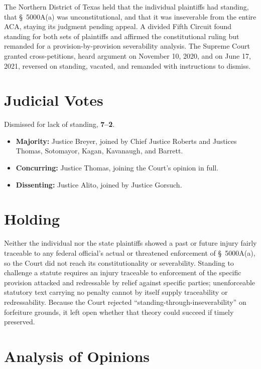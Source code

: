 \documentclass[12pt]{article}
\begin{document}
The Northern District of Texas held that the individual plaintiffs had standing, that \S\ 5000A(a) was unconstitutional, and that it was inseverable from the entire ACA, staying its judgment pending appeal. A divided Fifth Circuit found standing for both sets of plaintiffs and affirmed the constitutional ruling but remanded for a provision-by-provision severability analysis. The Supreme Court granted cross-petitions, heard argument on November 10, 2020, and on June 17, 2021, reversed on standing, vacated, and remanded with instructions to dismiss.

\section{Judicial Votes}

Dismissed for lack of standing, \textbf{7--2}.
\begin{itemize}
\item \textbf{Majority:} Justice Breyer, joined by Chief Justice Roberts and Justices Thomas, Sotomayor, Kagan, Kavanaugh, and Barrett.
\item \textbf{Concurring:} Justice Thomas, joining the Court's opinion in full.
\item \textbf{Dissenting:} Justice Alito, joined by Justice Gorsuch.
\end{itemize}

\section{Holding}

Neither the individual nor the state plaintiffs showed a past or future injury fairly traceable to any federal official's actual or threatened enforcement of \S\ 5000A(a), so the Court did not reach its constitutionality or severability. Standing to challenge a statute requires an injury traceable to enforcement of the specific provision attacked and redressable by relief against specific parties; unenforceable statutory text carrying no penalty cannot by itself supply traceability or redressability. Because the Court rejected ``standing-through-inseverability'' on forfeiture grounds, it left open whether that theory could succeed if timely preserved.

\section{Analysis of Opinions}
\end{document}
